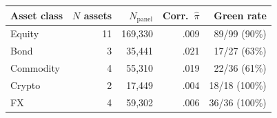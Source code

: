 \begin{tabular}{@{}lrrrr@{}}
\hline\hline
Asset class & $N$ assets & $N_{\text{panel}}$
& Corr.\ $\hat\pi$ & Green rate \\
\hline
Equity     & 11 & 169{,}330 & .009
& 89/99 (90\%) \\
Bond       &  3 & 35{,}441 & .021
& 17/27 (63\%) \\
Commodity  &  4 & 55{,}310 & .019
& 22/36 (61\%) \\
Crypto     &  2 & 17{,}449 & .004
& 18/18 (100\%) \\
FX         &  4 & 59{,}302 & .006
& 36/36 (100\%) \\
\hline\hline
\end{tabular}
